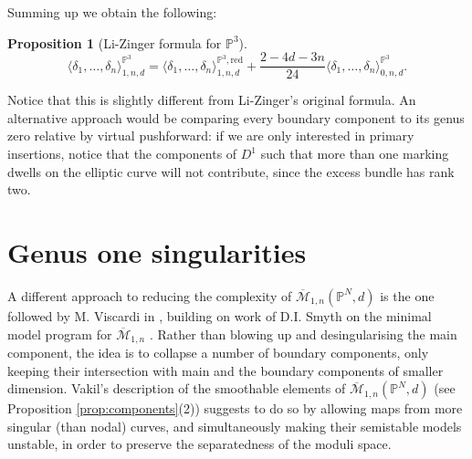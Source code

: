 \documentclass[11pt]{amsart}
\newcommand{\oM}{\overline{\mathcal{M}}}
\newcommand{\M}[4]{\overline{\mathcal{M}}_{#1,#2}(#3,#4)}
\newcommand{\PP}{\mathbb P}
\theoremstyle{definition}
\newtheorem{prop}[thm]{Proposition}
\theoremstyle{definition}
\begin{document}
Summing up we obtain the following:
\begin{prop}[Li-Zinger formula for $\PP^3$] \[\langle \delta_1,\ldots,\delta_n \rangle^{\PP^3}_{1,n,d}=\langle \delta_1,\ldots,\delta_n \rangle^{\PP^3,\mathrm{red}}_{1,n,d}+\frac{2-4d-3n}{24}\langle \delta_1,\ldots,\delta_n \rangle^{\PP^3}_{0,n,d}.\] \end{prop}
Notice that this is slightly different from Li-Zinger's original formula. An alternative approach would be comparing every boundary component to its genus zero relative by virtual pushforward: if we are only interested in primary insertions, notice that the components of $D^1$ such that more than one marking dwells on the elliptic curve will not contribute, since the excess bundle has rank two.

\section{Genus one singularities}
A different approach to reducing the complexity of $\M{1}{n}{\PP^N}{d}$ is the one followed by M. Viscardi in \cite{VISC}, building on work of D.I. Smyth on the minimal model program for $\oM_{1,n}$ \cite{SMY1}. Rather than blowing up and desingularising the main component, the idea is to collapse a number of boundary components, only keeping their intersection with main and the boundary components of smaller dimension. Vakil's description of the smoothable elements of $\M{1}{n}{\PP^N}{d}$ (see Proposition \ref{prop:components}(2)) suggests to do so by allowing maps from more singular (than nodal) curves, and simultaneously making their semistable models unstable, in order to preserve the separatedness of the moduli space.
\end{document}

